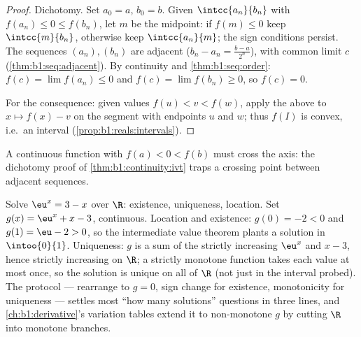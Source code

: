 \begin{proof}
Dichotomy. Set $a_0 = a$, $b_0 = b$. Given $\intcc{a_n}{b_n}$ with
$f(a_n) \leq 0 \leq f(b_n)$, let $m$ be the midpoint: if $f(m) \leq
0$ keep $\intcc{m}{b_n}$, otherwise keep $\intcc{a_n}{m}$; the sign
conditions persist. The sequences $(a_n), (b_n)$ are adjacent ($b_n -
a_n = \frac{b-a}{2^n}$), with common limit $c$
(\cref{thm:b1:seq:adjacent}). By continuity and
\cref{thm:b1:seq:order}: $f(c) = \lim f(a_n) \leq 0$ and $f(c) =
\lim f(b_n) \geq 0$, so $f(c) = 0$.

For the consequence: given values $f(u) < v < f(w)$, apply the above
to $x \mapsto f(x) - v$ on the segment with endpoints $u$ and $w$;
thus $f(I)$ is convex, i.e.\ an interval
(\cref{prop:b1:reals:intervals}).
\end{proof}

\begin{omfigure}

{\small A continuous function with $f(a) < 0 < f(b)$ must cross the
axis: the dichotomy proof of \cref{thm:b1:continuity:ivt} traps a
crossing point between adjacent sequences.}
\end{omfigure}

\begin{example}\label{ex:b1:continuity:protocol}
Solve $\eu^x = 3 - x$ over $\R$: existence, uniqueness,
location. Set $g(x) = \eu^x + x - 3$, continuous. Location and
existence: $g(0) = -2 < 0$ and $g(1) = \eu - 2 > 0$, so the
intermediate value theorem plants a solution in
$\intoo{0}{1}$. Uniqueness: $g$ is a sum of the strictly
increasing $\eu^x$ and $x - 3$, hence strictly increasing on
$\R$; a strictly monotone function takes each value at most
once, so the solution is unique on all of $\R$ (not just in the
interval probed). The protocol --- rearrange to $g = 0$, sign
change for existence, monotonicity for uniqueness --- settles
most ``how many solutions'' questions in three lines, and
\cref{ch:b1:derivative}'s variation tables
extend it to non-monotone $g$ by cutting $\R$ into monotone
branches.
\end{example}

